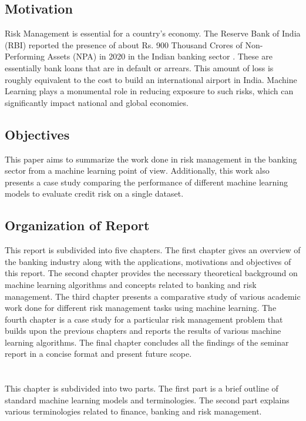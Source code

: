 \documentclass[a4paper, 12pt]{article}
\begin{document}
\vskip 0.2in
\subsection{Motivation}
Risk Management is essential for a country's economy. The Reserve Bank of India (RBI) reported the presence of about Rs. 900 Thousand Crores of Non-Performing Assets (NPA) in 2020 in the Indian banking sector \cite{rbi20}. These are essentially bank loans that are in default or arrears. This amount of loss is roughly equivalent to the cost to build an international airport in India. Machine Learning plays a monumental role in reducing exposure to such risks, which can significantly impact national and global economies.
\vskip 0.2in
\subsection{Objectives}
This paper aims to summarize the work done in risk management in the banking sector from a machine learning point of view. Additionally, this work also presents a case study comparing the performance of different machine learning models to evaluate credit risk on a single dataset.
\vskip 0.2in
\subsection{Organization of Report}
This report is subdivided into five chapters. The first chapter gives an overview of the banking industry along with the applications, motivations and objectives of this report. The second chapter provides the necessary theoretical background on machine learning algorithms and concepts related to banking and risk management. The third chapter presents a comparative study of various academic work done for different risk management tasks using machine learning. The fourth chapter is a case study for a particular risk management problem that builds upon the previous chapters and reports the results of various machine learning algorithms. The final chapter concludes all the findings of the seminar report in a concise format and present future scope.
\newpage

\section{}
\vskip 0.25in
This chapter is subdivided into two parts. The first part is a brief outline of standard machine learning models and terminologies. The second part explains various terminologies related to finance, banking and risk management.
\vskip 0.2in
\end{document}
